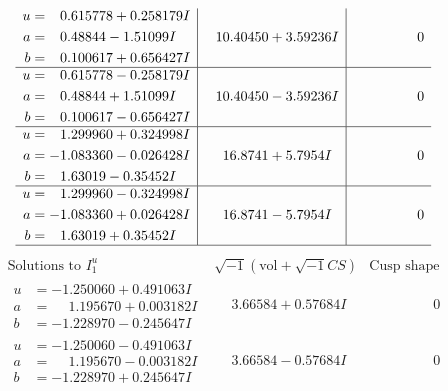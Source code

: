\documentclass[1p]{elsarticle_modified}
\theoremstyle{definition}
\newcommand{\I}{\sqrt{-1}}
\begin{document}
$$\begin{array}{c|c|c}
\begin{aligned}
u &= \phantom{-}0.615778 + 0.258179 I \\
a &= \phantom{-}0.48844 - 1.51099 I \\
b &= \phantom{-}0.100617 + 0.656427 I\end{aligned}
 & \phantom{-}10.40450 + 3.59236 I & \phantom{-0.000000 } 0 \\ \hline\begin{aligned}
u &= \phantom{-}0.615778 - 0.258179 I \\
a &= \phantom{-}0.48844 + 1.51099 I \\
b &= \phantom{-}0.100617 - 0.656427 I\end{aligned}
 & \phantom{-}10.40450 - 3.59236 I & \phantom{-0.000000 } 0 \\ \hline\begin{aligned}
u &= \phantom{-}1.299960 + 0.324998 I \\
a &= -1.083360 - 0.026428 I \\
b &= \phantom{-}1.63019 - 0.35452 I\end{aligned}
 & \phantom{-}16.8741 + 5.7954 I & \phantom{-0.000000 } 0 \\ \hline\begin{aligned}
u &= \phantom{-}1.299960 - 0.324998 I \\
a &= -1.083360 + 0.026428 I \\
b &= \phantom{-}1.63019 + 0.35452 I\end{aligned}
 & \phantom{-}16.8741 - 5.7954 I & \phantom{-0.000000 } 0\\
 \hline 
 \end{array}$$\newpage$$\begin{array}{c|c|c}  
\text{Solutions to }I^u_{1}& \I (\text{vol} + \sqrt{-1}CS) & \text{Cusp shape}\\
 \hline 
\begin{aligned}
u &= -1.250060 + 0.491063 I \\
a &= \phantom{-}1.195670 + 0.003182 I \\
b &= -1.228970 - 0.245647 I\end{aligned}
 & \phantom{-}3.66584 + 0.57684 I & \phantom{-0.000000 } 0 \\ \hline\begin{aligned}
u &= -1.250060 - 0.491063 I \\
a &= \phantom{-}1.195670 - 0.003182 I \\
b &= -1.228970 + 0.245647 I\end{aligned}
 & \phantom{-}3.66584 - 0.57684 I & \phantom{-0.000000 } 0 \\ \hline\begin{aligned}

\end{aligned}
\end{array}$$
\end{document}
